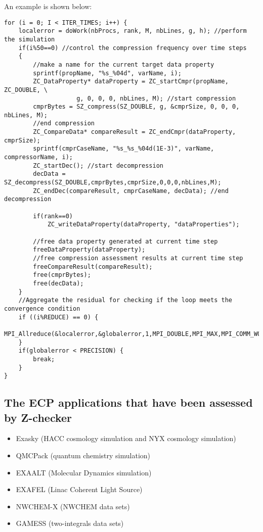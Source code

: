 An example is shown below:
\begin{lstlisting}[style=CStyle, basicstyle = \footnotesize\ttfamily]
for (i = 0; I < ITER_TIMES; i++) {
    localerror = doWork(nbProcs, rank, M, nbLines, g, h); //perform the simulation
    if(i%50==0) //control the compression frequency over time steps
    {
        //make a name for the current target data property
    	sprintf(propName, "%s_%04d", varName, i);
    	ZC_DataProperty* dataProperty = ZC_startCmpr(propName, ZC_DOUBLE, \
                    g, 0, 0, 0, nbLines, M); //start compression
    	cmprBytes = SZ_compress(SZ_DOUBLE, g, &cmprSize, 0, 0, 0, nbLines, M);
        //end compression
    	ZC_CompareData* compareResult = ZC_endCmpr(dataProperty, cmprSize);
    	sprintf(cmprCaseName, "%s_%s_%04d(1E-3)", varName, compressorName, i);
    	ZC_startDec(); //start decompression
    	decData = SZ_decompress(SZ_DOUBLE,cmprBytes,cmprSize,0,0,0,nbLines,M);	
    	ZC_endDec(compareResult, cmprCaseName, decData); //end decompression			

    	if(rank==0)
    		ZC_writeDataProperty(dataProperty, "dataProperties");
    	
        //free data property generated at current time step		
    	freeDataProperty(dataProperty);
        //free compression assessment results at current time step
    	freeCompareResult(compareResult);
    	free(cmprBytes);
    	free(decData);
    }
    //Aggregate the residual for checking if the loop meets the convergence condition
    if ((i%REDUCE) == 0) {
    	MPI_Allreduce(&localerror,&globalerror,1,MPI_DOUBLE,MPI_MAX,MPI_COMM_WORLD);
    }
    if(globalerror < PRECISION) {
    	break;
    }
}

\end{lstlisting}

\subsection{The ECP applications that have been assessed by Z-checker}

\begin{itemize}
  \item Exasky (HACC cosmology simulation and NYX cosmology simulation)
  \item QMCPack (quantum chemistry simulation)
  \item EXAALT (Molecular Dynamics simulation)
  \item EXAFEL (Linac Coherent Light Source)
  \item NWCHEM-X (NWCHEM data sets)
  \item GAMESS (two-integrals data sets)
\end{itemize}

